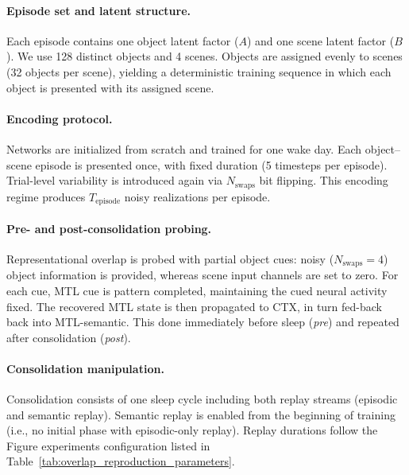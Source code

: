 \documentclass{article}
\begin{document}
\paragraph{Episode set and latent structure.}
Each episode contains one object latent factor ($A$) and one scene latent factor ($B$). We use 128 distinct objects and 4 scenes. Objects are assigned evenly to scenes (32 objects per scene), yielding a deterministic training sequence in which each object is presented with its assigned scene.

\paragraph{Encoding protocol.}
Networks are initialized from scratch and trained for one wake day. Each object--scene episode is presented once, with fixed duration (5 timesteps per episode). Trial-level variability is introduced again via $N_\textrm{swaps}$ bit flipping. This encoding regime produces $T_\textrm{episode}$ noisy realizations per episode.

\paragraph{Pre- and post-consolidation probing.}
Representational overlap is probed with partial object cues: noisy ($N_\textrm{swaps} = 4$) object information is provided, whereas scene input channels are set to zero. For each cue, MTL cue is pattern completed, maintaining the cued neural activity fixed. The recovered MTL state is then propagated to CTX, in turn fed-back back into MTL-semantic. This done immediately before sleep (\textit{pre}) and repeated after consolidation (\textit{post}).

\paragraph{Consolidation manipulation.}
Consolidation consists of one sleep cycle including both replay streams (episodic and semantic replay). Semantic replay is enabled from the beginning of training (i.e., no initial phase with episodic-only replay). Replay durations follow the Figure experiments configuration listed in Table~\ref{tab:overlap_reproduction_parameters}.
\end{document}
